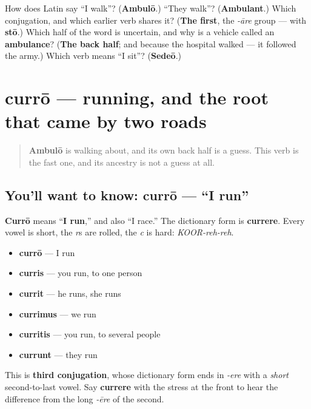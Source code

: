 \begin{tcolorbox}[breakable,colback=teal!4,colframe=teal!35!black,title={Before you move on}]
How does Latin say \textquotedblleft{}I walk\textquotedblright{}? (\textbf{Ambulō}.) \textquotedblleft{}They walk\textquotedblright{}? (\textbf{Ambulant}.) Which conjugation, and which earlier verb shares it? (\textbf{The first}, the \emph{-āre} group — with \textbf{stō}.) Which half of the word is uncertain, and why is a vehicle called an \textbf{ambulance}? (\textbf{The back half}; and because the hospital walked — it followed the army.) Which verb means \textquotedblleft{}I sit\textquotedblright{}? (\textbf{Sedeō}.)
\end{tcolorbox}
\section[currō, currere]{currō — running, and the root that came by two roads}

\label{lesson:LA-C41-curro}



\begin{quote}
\textbf{Ambulō} is walking about, and its own back half is a guess. This verb is the fast one, and its ancestry is not a guess at all.
\end{quote}

\subsection*{You'll want to know: currō — \textquotedblleft{}I run\textquotedblright{}}
\textbf{Currō} means \textquotedblleft{}\textbf{I run},\textquotedblright{} and also \textquotedblleft{}I race.\textquotedblright{} The dictionary form is \textbf{currere}. Every vowel is short, the \emph{r}s are rolled, the \emph{c} is hard: \emph{KOOR-reh-reh}.

\begin{itemize}
\raggedright
  \item \textbf{currō} — I run
  \item \textbf{curris} — you run, to one person
  \item \textbf{currit} — he runs, she runs
  \item \textbf{currimus} — we run
  \item \textbf{curritis} — you run, to several people
  \item \textbf{currunt} — they run
\end{itemize}

This is \textbf{third conjugation}, whose dictionary form ends in \emph{-ere} with a \emph{short} second-to-last vowel. Say \textbf{currere} with the stress at the front to hear the difference from the long \emph{-ēre} of the second.

